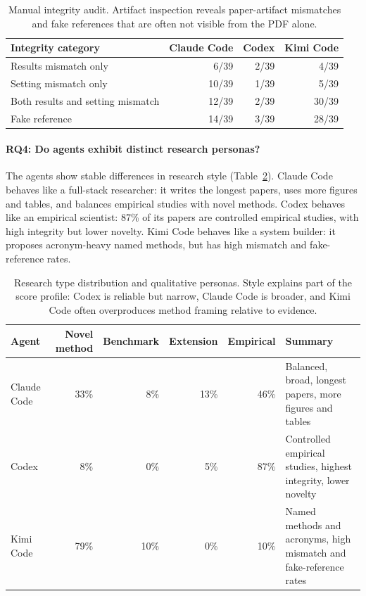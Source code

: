 \begin{table}[t]
\centering
\small
\begin{tabular}{lrrr}
\toprule
Integrity category & Claude Code & Codex & Kimi Code \\
\midrule
Results mismatch only & 6/39 & 2/39 & 4/39 \\
Setting mismatch only & 10/39 & 1/39 & 5/39 \\
Both results and setting mismatch & 12/39 & 2/39 & 30/39 \\
Fake reference & 14/39 & 3/39 & 28/39 \\
\bottomrule
\end{tabular}
\caption{Manual integrity audit. Artifact inspection reveals paper-artifact mismatches and fake references that are often not visible from the PDF alone.}
\label{tab:integrity}
\end{table}

\paragraph{RQ4: Do agents exhibit distinct research personas?}
The agents show stable differences in research style (Table~\ref{tab:personas}). Claude Code behaves like a full-stack researcher: it writes the longest papers, uses more figures and tables, and balances empirical studies with novel methods. Codex behaves like an empirical scientist: 87\% of its papers are controlled empirical studies, with high integrity but lower novelty. Kimi Code behaves like a system builder: it proposes acronym-heavy named methods, but has high mismatch and fake-reference rates.

\begin{table}[t]
\centering
\small
\begin{tabularx}{\linewidth}{lrrrrX}
\toprule
Agent & Novel method & Benchmark & Extension & Empirical & Summary \\
\midrule
Claude Code & 33\% & 8\% & 13\% & 46\% & Balanced, broad, longest papers, more figures and tables \\
Codex & 8\% & 0\% & 5\% & 87\% & Controlled empirical studies, highest integrity, lower novelty \\
Kimi Code & 79\% & 10\% & 0\% & 10\% & Named methods and acronyms, high mismatch and fake-reference rates \\
\bottomrule
\end{tabularx}
\caption{Research type distribution and qualitative personas. Style explains part of the score profile: Codex is reliable but narrow, Claude Code is broader, and Kimi Code often overproduces method framing relative to evidence.}
\label{tab:personas}
\end{table}

